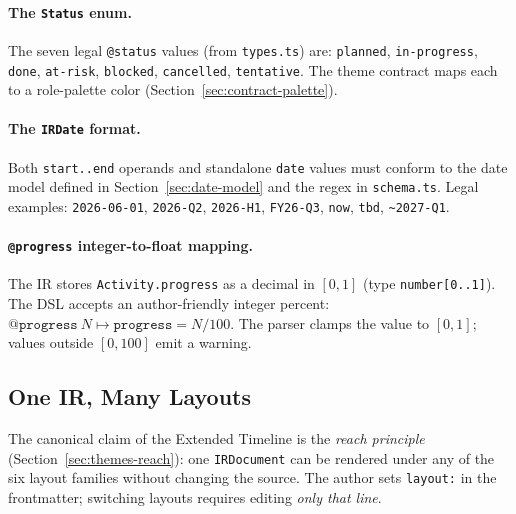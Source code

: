 \paragraph{The \texttt{Status} enum.}
The seven legal \texttt{@status} values (from \texttt{types.ts}) are:
\texttt{planned}, \texttt{in-progress}, \texttt{done}, \texttt{at-risk},
\texttt{blocked}, \texttt{cancelled}, \texttt{tentative}.
The theme contract maps each to a role-palette color
(Section~\ref{sec:contract-palette}).

\paragraph{The \texttt{IRDate} format.}
Both \texttt{start..end} operands and standalone \texttt{date} values must
conform to the date model defined in Section~\ref{sec:date-model} and the
regex in \texttt{schema.ts}.  Legal examples: \texttt{2026-06-01},
\texttt{2026-Q2}, \texttt{2026-H1}, \texttt{FY26-Q3}, \texttt{now},
\texttt{tbd}, \texttt{\~{}2027-Q1}.

\paragraph{\texttt{@progress} integer-to-float mapping.}
The IR stores \texttt{Activity.progress} as a decimal in $[0, 1]$ (type
\texttt{number[0..1]}).  The DSL accepts an author-friendly integer percent:
$\texttt{@progress}\ N \mapsto \texttt{progress} = N / 100$.  The parser
clamps the value to $[0, 1]$; values outside $[0, 100]$ emit a warning.

\subsection{One IR, Many Layouts}
\label{sec:et-layouts}

The canonical claim of the Extended Timeline is the \emph{reach principle}
(Section~\ref{sec:themes-reach}): one \texttt{IRDocument} can be rendered
under any of the six layout families without changing the source.  The
author sets \texttt{layout:} in the frontmatter; switching layouts requires
editing \emph{only that line}.

